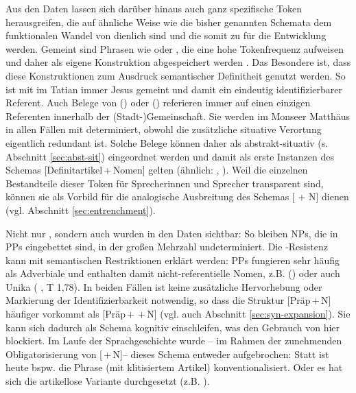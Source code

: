 Aus den Daten lassen sich darüber hinaus auch ganz spezifische Token herausgreifen, die auf ähnliche Weise wie die bisher genannten Schemata dem funktionalen Wandel von  dienlich sind und die somit zu  für die Entwicklung werden. Gemeint sind Phrasen wie  oder , die eine hohe Tokenfrequenz aufweisen und daher als eigene Konstruktion abgespeichert werden \parencite[= Token-Entrenchment, s.][]{Ziem2013}. Das Besondere ist, dass diese Konstruktionen zum Ausdruck semantischer Definitheit genutzt werden. So ist mit   im Tatian immer Jesus gemeint und damit ein eindeutig identifizierbarer Referent. Auch Belege von   () oder   () referieren immer auf einen einzigen Referenten innerhalb der (Stadt-)Gemeinschaft. Sie werden im Monseer Matthäus in allen Fällen mit  determiniert, obwohl die zusätzliche situative Verortung eigentlich redundant ist. Solche Belege können daher als abstrakt-situativ (s. Abschnitt \ref{sec:abst-sit}) eingeordnet werden und damit als erste Instanzen des Schemas [Definitartikel\,+\,Nomen] gelten (ähnlich: , ). Weil die einzelnen Bestandteile dieser Token für Sprecherinnen und Sprecher transparent sind, können sie als Vorbild für die analogische Ausbreitung des Schemas [ + N] dienen (vgl. Abschnitt \ref{sec:entrenchment}). 

Nicht nur , sondern auch  wurden in den Daten sichtbar: So bleiben NPs, die in PPs eingebettet sind, in der großen Mehrzahl undeterminiert. Die -Resistenz kann mit semantischen Restriktionen erklärt werden: PPs fungieren sehr häufig als Adverbiale und enthalten damit nicht-referentielle Nomen, z.B.  () oder auch Unika ( , T 1,78). In beiden Fällen ist keine zusätzliche Hervorhebung oder Markierung der Identifizierbarkeit notwendig, so dass die Struktur [Präp\,+\,N] häufiger vorkommt als [Präp\,+\,\,+\,N] (vgl. auch Abschnitt \ref{sec:syn-expansion}). Sie kann sich dadurch als Schema kognitiv einschleifen, was den Gebrauch von  hier blockiert. Im Laufe der Sprachgeschichte wurde -- im Rahmen der zunehmenden Obligatorisierung von [\,+\,N]-- dieses Schema entweder aufgebrochen: Statt  ist heute bspw. die Phrase  (mit klitisiertem Artikel) konventionalisiert. Oder es hat sich die artikellose Variante durchgesetzt (z.B. ).

